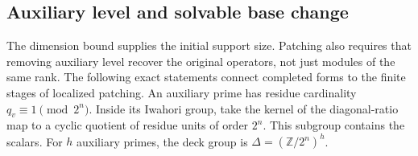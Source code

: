 \subsection{Auxiliary level and solvable base change}

The dimension bound supplies the initial support size. Patching
also requires that removing auxiliary level recover the original
operators, not just modules of the same rank. The following exact
statements connect completed forms
to the finite stages of localized patching. An auxiliary
prime has residue cardinality \(q_v\equiv1\pmod{2^n}\).
Inside its Iwahori group, take the kernel of the
diagonal-ratio map to a cyclic quotient of residue units
of order \(2^n\). This subgroup contains the scalars.
For \(h\) auxiliary primes, the deck group is
\(\Delta=(\mathbb Z/2^n)^h\).

